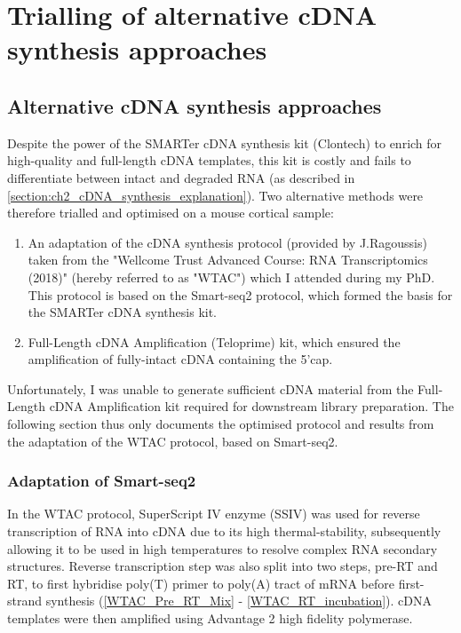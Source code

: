 \chapter{Trialling of alternative cDNA synthesis approaches}\label{ch:alt_cDNA}

\stoptocwriting
\section{Alternative cDNA synthesis approaches}
Despite the power of the SMARTer cDNA synthesis kit (Clontech) to enrich for high-quality and full-length cDNA templates, this kit is costly and fails to differentiate between intact and degraded RNA (as described in \cref{section:ch2_cDNA_synthesis_explanation}). Two alternative methods were therefore trialled and optimised on a mouse cortical sample:
\begin{enumerate}
	\item An adaptation of the cDNA synthesis protocol (provided by J.Ragoussis) taken from the "Wellcome Trust Advanced Course: RNA Transcriptomics (2018)" (hereby referred to as "WTAC") which I attended during my PhD. This protocol is based on the Smart-seq2 protocol\cite{Picelli2014}, which formed the basis for the SMARTer cDNA synthesis kit. 
	\item Full-Length cDNA Amplification (Teloprime) kit, which ensured the amplification of fully-intact cDNA containing the 5'cap.    
\end{enumerate}

Unfortunately, I was unable to generate sufficient cDNA material from the Full-Length cDNA Amplification kit required for downstream library preparation. The following section thus only documents the optimised protocol and results from the adaptation of the WTAC protocol, based on Smart-seq2.

\subsection{Adaptation of Smart-seq2}
In the WTAC protocol, SuperScript IV enzyme (SSIV) was used for reverse transcription of RNA into cDNA due to its high thermal-stability, subsequently allowing it to be used in high temperatures to resolve complex RNA secondary structures. Reverse transcription step was also split into two steps, pre-RT and RT, to first hybridise poly(T) primer to poly(A) tract of mRNA before first-strand synthesis (\cref{WTAC_Pre_RT_Mix} - \cref{WTAC_RT_incubation}). cDNA templates were then amplified using Advantage 2 high fidelity polymerase.


